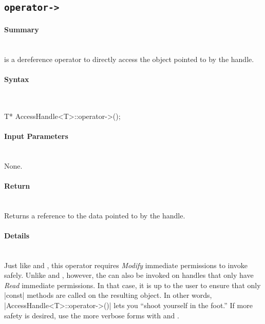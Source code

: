 \subsection{\texttt{operator->}}

\paragraph{Summary}\mbox{}\\
 is a dereference operator to directly access the object 
pointed to by the \gls{handle}.

\paragraph{Syntax}\mbox{}\\
\begin{CppCode}
T* AccessHandle<T>::operator->();
\end{CppCode}

\paragraph{Input Parameters}\mbox{}\\
None.

\paragraph{Return}\mbox{}\\
Returns a reference to the data pointed to by the \gls{handle}.

\paragraph{Details}\mbox{}\\
Just like  and , this operator
requires {\it Modify} \gls{immediate permissions} to invoke safely.  Unlike 
 and , however, the
 can
also be invoked on \glspl{handle} that only have {\it Read} \gls{immediate
permissions}.  In
that case, it is up to the user to ensure that only |const| methods are
called on the resulting object.  In other words,
|AccessHandle<T>::operator->()| lets you ``shoot yourself in the foot.''
If more safety is desired, use the more  verbose forms with
 and .


